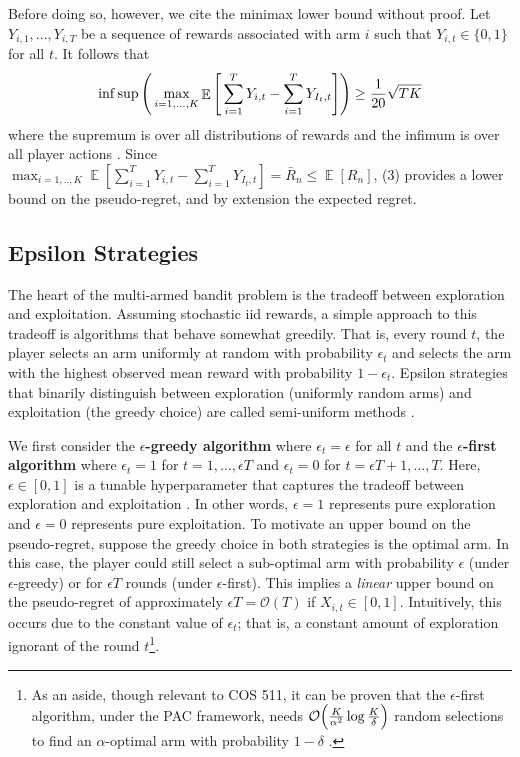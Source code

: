 \documentclass[12pt]{article}
\DeclareMathOperator*{\E}{\mathbb{E}}
\begin{document}
Before doing so, however, we cite the minimax lower bound without proof. Let $Y_{i,1},...,Y_{i,T}$ be a sequence of rewards associated with arm $i$ such that $Y_{i,t}\in\{0,1\}$ for all $t$. It follows that
\begin{align}
\inf\sup\Bigg{(}\max_{i=1,...,K}\E\Bigg{[}\sum_{i=1}^{T}Y_{i,t}-\sum_{i=1}^{T}Y_{I_{t},t}\Bigg{]}\Bigg{)}\geq\frac{1}{20}\sqrt{TK}
\end{align}
where the supremum is over all distributions of rewards and the infimum is over all player actions \cite{bubeck2012}. Since $\max_{i=1,..,K}\E[\sum_{i=1}^{T}Y_{i,t}-\sum_{i=1}^{T}Y_{I_{t},t}]=\bar{R}_{n}\leq\E[R_{n}]$, (3) provides a lower bound on the pseudo-regret, and by extension the expected regret.

\subsection{Epsilon Strategies}

The heart of the multi-armed bandit problem is the tradeoff between exploration and exploitation. Assuming stochastic iid rewards, a simple approach to this tradeoff is algorithms that behave somewhat greedily. That is, every round $t$, the player selects an arm uniformly at random with probability $\epsilon_{t}$ and selects the arm with the highest observed mean reward with probability $1-\epsilon_{t}$. Epsilon strategies that binarily distinguish between exploration (uniformly random arms) and exploitation (the greedy choice) are called semi-uniform methods \cite{mohri2005}.

We first consider the \textbf{$\epsilon$-greedy algorithm} where $\epsilon_{t}=\epsilon$ for all $t$ and the \textbf{$\epsilon$-first algorithm} where $\epsilon_{t}=1$ for $t=1,...,\epsilon T$ and $\epsilon_{t}=0$ for $t=\epsilon T+1,...,T$. Here, $\epsilon\in[0,1]$ is a tunable hyperparameter that captures the tradeoff between exploration and exploitation \cite{sutton1998}. In other words, $\epsilon=1$ represents pure exploration and $\epsilon=0$ represents pure exploitation. To motivate an upper bound on the pseudo-regret, suppose the greedy choice in both strategies is the optimal arm. In this case, the player could still select a sub-optimal arm with probability $\epsilon$ (under $\epsilon$-greedy) or for $\epsilon T$ rounds (under $\epsilon$-first). This implies a \textit{linear} upper bound on the pseudo-regret of approximately $\epsilon T=\mathcal{O}(T)$ if $X_{i,t}\in[0,1]$. Intuitively, this occurs due to the constant value of $\epsilon_{t}$; that is, a constant amount of exploration ignorant of the round $t$\footnote{As an aside, though relevant to COS 511, it can be proven that the $\epsilon$-first algorithm, under the PAC framework, needs $\mathcal{O}\Big{(}\frac{K}{\alpha^{2}}\log\frac{K}{\delta}\Big{)}$ random selections to find an $\alpha$-optimal arm with probability $1-\delta$ \cite{evendar2002}.}.
\end{document}
